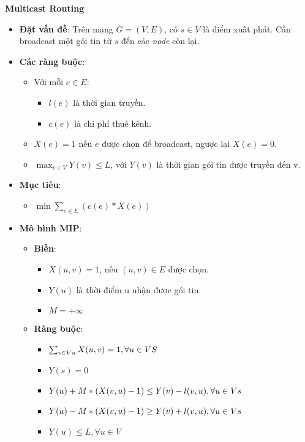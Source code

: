 \documentclass{article}
\begin{document}
\textbf{Multicast Routing}

\begin{itemize}
	\item \textbf{Đặt vấn đề}: Trên mạng $G = (V, E)$, có $s \in V$ là điểm xuất phát. Cần broadcast một gói tin từ $s$ đến các \emph{node} còn lại.
	\item \textbf{Các ràng buộc}:
	\begin{itemize}
		\item Với mỗi $e \in E$:
		\begin{itemize}
			\item $l(e)$ là thời gian truyền.
			\item $c(e)$ là chi phí thuê kênh.
		\end{itemize}
		\item $X(e) = 1$ nếu $e$ được chọn để broadcast, ngược lại $X(e) = 0$.
		\item $\max_{v \in V} Y(v) \leq L$, với $Y(v)$ là thời gian gói tin được truyền đến v.
	\end{itemize}
	\item \textbf{Mục tiêu}:
	\begin{itemize}
		\item $\min{\sum_{e \in E}^{} (c(e) * X(e))}$
	\end{itemize}
	\item \textbf{Mô hình MIP}:
	\begin{itemize}
		\item \textbf{Biến}:
		\begin{itemize}
			\item $X(u, v) = 1$, nếu $(u, v) \in E$ được chọn.
			\item $Y(u)$ là thời điểm u nhận được gói tin.
			\item $M = +\infty$
		\end{itemize}
		\item \textbf{Ràng buộc}:
		\begin{itemize}
			\item $\sum_{v \in V \\ {u}} X(u, v) = 1, \forall u \in V \\ {S}$
			\item $Y(s) = 0$
			\item $Y(u) + M * (X(v, u) - 1) \leq Y(v) - l(v, u), \forall u \in V \\ {s}$
			\item $Y(u) - M * (X(v, u) - 1) \geq Y(v) + l(v, u), \forall u \in V \\ {s}$
			\item $Y(u) \leq L, \forall u \in V$

\end{itemize}
\end{itemize}
\end{itemize}
\end{document}
